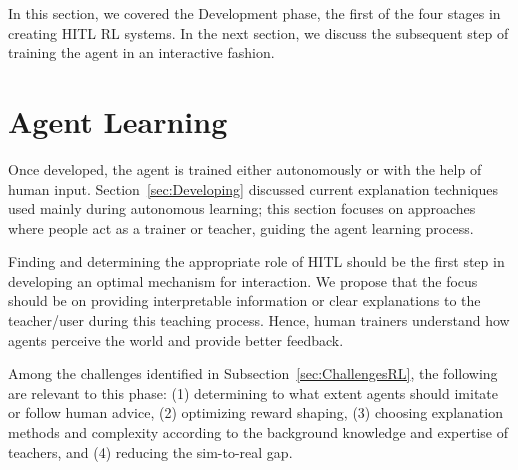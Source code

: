 \documentclass[twoside,11pt]{article}
\begin{document}
In this section, we covered the Development phase, the first of the four stages in creating HITL RL systems. In the next section, we discuss the subsequent step of training the agent in an interactive fashion.

\section{Agent Learning}
\label{sec:AgentLearning}


Once developed, the agent is trained either autonomously or with the help of human input. Section~\ref{sec:Developing} discussed current explanation techniques used mainly during autonomous learning; this section focuses on approaches where people act as a trainer or teacher, guiding the agent learning process.

Finding and determining the appropriate role of HITL should be the first step in developing an optimal mechanism for interaction. We propose that the focus should be on providing interpretable information or clear explanations to the teacher/user during this teaching process. Hence, human trainers understand how agents perceive the world and provide better feedback.

Among the challenges identified in Subsection~\ref{sec:ChallengesRL}, the following are relevant to this phase: (1) determining to what extent agents should imitate or follow human advice, (2) optimizing reward shaping,  (3) choosing explanation methods and complexity according to the background knowledge and expertise of teachers, and (4) reducing the sim-to-real gap. 

\end{document}
